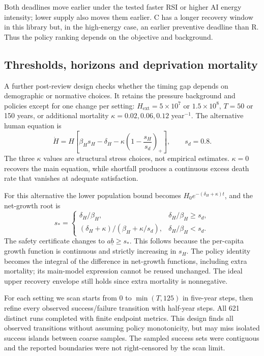 \documentclass[12pt,a4paper]{article}
\theoremstyle{remark}
\newcommand{\Hext}{H_{\mathrm{ext}}}
\begin{document}
Both deadlines move earlier under the tested faster RSI or higher AI energy intensity; lower supply also moves them earlier. C has a longer recovery window in this library but, in the high-energy case, an earlier preventive deadline than R. Thus the policy ranking depends on the objective and background.

\subsection{Thresholds, horizons and deprivation mortality}
A further post-review design checks whether the timing gap depends on demographic or normative choices. It retains the pressure background and policies except for one change per setting: $\Hext=5\times10^7$ or $1.5\times10^8$, $T=50$ or 150 years, or additional mortality $\kappa=0.02,0.06,0.12$ year$^{-1}$. The alternative human equation is
\begin{equation}\label{eq:deprivation}
\dot H=H\left[\beta_Hs_H-\delta_H-\kappa\left(1-\frac{s_H}{s_d}\right)_+\right],\qquad s_d=0.8.
\end{equation}
The three $\kappa$ values are structural stress choices, not empirical estimates. $\kappa=0$ recovers the main equation, while shortfall produces a continuous excess death rate that vanishes at adequate satisfaction.

For this alternative the lower population bound becomes $H_0e^{-(\delta_H+\kappa)t}$, and the net-growth root is
\begin{equation}\label{eq:sstar}
s_* =\begin{cases}
\delta_H/\beta_H,&\delta_H/\beta_H\ge s_d,\\
(\delta_H+\kappa)/(\beta_H+\kappa/s_d),&\delta_H/\beta_H<s_d.
\end{cases}
\end{equation}
The safety certificate changes to $a\underline b\ge s_*$. This follows because the per-capita growth function is continuous and strictly increasing in $s_H$. The policy identity becomes the integral of the difference in net-growth functions, including extra mortality; its main-model expression cannot be reused unchanged. The ideal upper recovery envelope still holds since extra mortality is nonnegative.

For each setting we scan starts from 0 to $\min(T,125)$ in five-year steps, then refine every observed success/failure transition with half-year steps. All 621 distinct runs completed with finite endpoint metrics. This design finds all observed transitions without assuming policy monotonicity, but may miss isolated success islands between coarse samples. The sampled success sets were contiguous and the reported boundaries were not right-censored by the scan limit.
\end{document}
